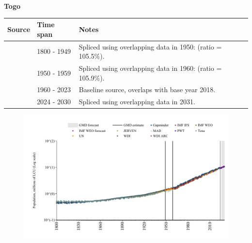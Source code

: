 \documentclass[12pt,a4paper,landscape]{article}
\begin{document}
\begin{adjustbox}{max totalsize={\paperwidth}{\paperheight},center}
\begin{minipage}[t][\textheight][t]{\textwidth}
\vspace*{0.5cm}
{}
\begin{center}
{\Large\bfseries Togo}
\end{center}
\vspace{0.5cm}
\begin{table}[H]
\centering
\small
\begin{tabular}{|l|l|l|}
\hline
\textbf{Source} & \textbf{Time span} & \textbf{Notes} \\
\hline
\rowcolor{white}\cite{Gapminder}& 1800 - 1949 &Spliced using overlapping data in 1950: (ratio = 105.5\%).\\
\rowcolor{lightgray}\cite{IMF_IFS}& 1950 - 1959 &Spliced using overlapping data in 1960: (ratio = 105.9\%).\\
\rowcolor{white}\cite{WDI}& 1960 - 2023 &Baseline source, overlaps with base year 2018.\\
\rowcolor{lightgray}\cite{Gapminder}& 2024 - 2030 &Spliced using overlapping data in 2031.\\
\hline
\end{tabular}
\end{table}
\begin{figure}[H]
\centering
\includegraphics[width=\textwidth,height=0.6\textheight,keepaspectratio]{graphs/TGO_pop.pdf}
\end{figure}
\end{minipage}
\end{adjustbox}
\end{document}
